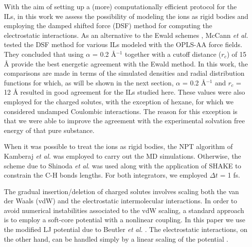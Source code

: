\documentclass[3p,twocolumn]{elsarticle}
\begin{document}
With the aim of setting up a (more) computationally efficient protocol for the ILs, in this work we assess the possibility of modeling the ions as rigid bodies and employing the damped shifted force (DSF) method \cite{Fennell2006} for computing the electrostatic interactions. As an alternative to the Ewald schemes \cite{Ewald_1921,Darden_1993,Hockney_1988}, McCann \textit{et al.} \cite{McCann_2013} tested the DSF method for various ILs modeled with the OPLS-AA force fields. They concluded that using $\alpha$ = 0.2 {\AA}$^{-1}$ together with a cutoff distance ($r_c$) of 15 {\AA} provide the best energetic agreement with the Ewald method. In this work, the comparisons are made in terms of the simulated densities and radial distribution functions for which, as will be shown in the next section, $\alpha$ = 0.2 {\AA}$^{-1}$ and $r_c$ = 12 {\AA} resulted in good agreement for the ILs studied here. These values were also employed for the charged solutes, with the exception of hexane, for which we considered undamped Coulombic interactions. The reason for this exception is that we were able to improve the agreement with the experimental solvation free energy of that pure substance.

When it was possible to treat the ions as rigid bodies, the NPT algorithm of Kamberaj \textit{et al.} \cite{Kamberaj_2005} was employed to carry out the MD simulations. Otherwise, the scheme due to Shinoda \textit{et al}. \cite{Shinoda2004} was used along with the application of SHAKE \cite{Ryckaert1977} to constrain the C-H bonds lengths. For both integrators, we employed $\Delta t$ = 1 fs.

The gradual insertion/deletion of charged solutes involves scaling both the van der Waals (vdW) and the electrostatic intermolecular interactions. In order to avoid numerical instabilities associated to the vdW scaling, a standard approach is to employ a soft-core potential with a nonlinear coupling. In this paper we use the modified LJ potential due to Beutler \textit{et al.} \cite{Beutler_1994}. The electrostatic interactions, on the other hand, can be handled simply by a linear scaling of the potential \cite{Naden_2015}.
\end{document}
